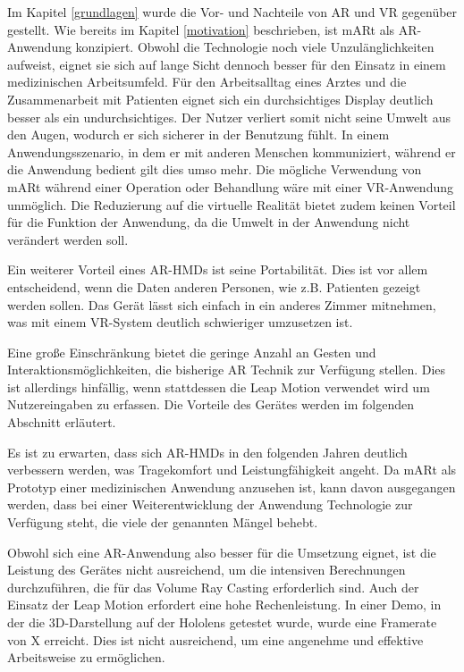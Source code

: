 Im Kapitel \ref{grundlagen} wurde die Vor- und Nachteile von AR und VR gegenüber gestellt.
Wie bereits im Kapitel \ref{motivation} beschrieben, ist mARt als AR-Anwendung konzipiert. Obwohl die Technologie noch viele Unzulänglichkeiten aufweist, eignet sie sich auf lange Sicht dennoch besser für den Einsatz in einem medizinischen Arbeitsumfeld.
Für den Arbeitsalltag eines Arztes und die Zusammenarbeit mit Patienten eignet sich ein durchsichtiges Display deutlich besser als ein undurchsichtiges. Der Nutzer verliert somit nicht seine Umwelt aus den Augen, wodurch er sich sicherer in der Benutzung fühlt. In einem Anwendungsszenario, in dem er mit anderen Menschen kommuniziert, während er die Anwendung bedient gilt dies umso mehr. Die mögliche Verwendung von mARt während einer Operation oder Behandlung wäre mit einer VR-Anwendung unmöglich. Die Reduzierung auf die virtuelle Realität bietet zudem keinen Vorteil für die Funktion der Anwendung, da die Umwelt in der Anwendung nicht verändert werden soll. 

Ein weiterer Vorteil eines AR-HMDs ist seine Portabilität. Dies ist vor allem entscheidend, wenn die Daten anderen Personen, wie z.B. Patienten gezeigt werden sollen. Das Gerät lässt sich einfach in ein anderes Zimmer mitnehmen, was mit einem VR-System deutlich schwieriger umzusetzen ist.
 
Eine große Einschränkung bietet die geringe Anzahl an Gesten und Interaktionsmöglichkeiten, die bisherige AR Technik zur Verfügung stellen. Dies ist allerdings hinfällig, wenn stattdessen die Leap Motion verwendet wird um Nutzereingaben zu erfassen. Die Vorteile des Gerätes werden im folgenden Abschnitt erläutert.

Es ist zu erwarten, dass sich AR-HMDs in den folgenden Jahren deutlich verbessern werden, was Tragekomfort und Leistungfähigkeit angeht. Da mARt als Prototyp einer medizinischen Anwendung anzusehen ist, kann davon ausgegangen werden, dass bei einer Weiterentwicklung der Anwendung Technologie zur Verfügung steht, die viele der genannten Mängel behebt.

Obwohl sich eine AR-Anwendung also besser für die Umsetzung eignet, ist die Leistung des Gerätes nicht ausreichend, um die intensiven Berechnungen durchzuführen, die für das Volume Ray Casting erforderlich sind. Auch der Einsatz der Leap Motion erfordert eine hohe Rechenleistung.
In einer Demo, in der die 3D-Darstellung auf der Hololens getestet wurde, wurde eine Framerate von X erreicht. 
Dies ist nicht ausreichend, um eine angenehme und effektive Arbeitsweise zu ermöglichen. 

